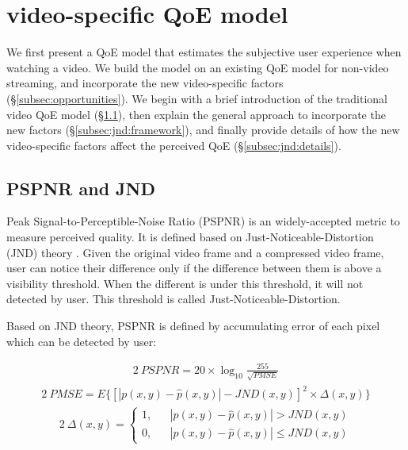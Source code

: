 
\section{\vr video-specific QoE model}
\label{sec:jnd}

We first present a QoE model that estimates the subjective user experience when watching a \vr video.
We build the model on an existing QoE model for non-\vr video streaming, and incorporate the new \vr video-specific factors (\S\ref{subsec:opportunities}).
We begin with a brief introduction of the traditional video QoE model (\S\ref{subsec:jnd:pspnr}), then explain the general approach to incorporate the new factors (\S\ref{subsec:jnd:framework}), and finally provide details of how the new \vr video-specific factors affect the perceived QoE (\S\ref{subsec:jnd:details}).

\subsection{PSPNR and JND}
\label{subsec:jnd:pspnr}

Peak Signal-to-Perceptible-Noise Ratio (PSPNR) \cite{PSPNR} is an widely-accepted metric to measure perceived quality. It is defined based on Just-Noticeable-Distortion (JND) theory \cite{JND}. Given the original video frame and a compressed video frame, user can notice their difference only if the difference between them is above a visibility threshold. When the different is under this threshold, it will not detected by user. This threshold is called Just-Noticeable-Distortion.

Based on JND theory, PSPNR is defined by accumulating error of each pixel which can be detected by user:

\begin{alignat}{2}\
\label{f1} PSPNR = 20 \times \log_{10}\frac{255}{\sqrt{PMSE}}
\end{alignat}
\begin{alignat}{2}\
PMSE=E\{ \left[ |p(x, y) - \hat{p}(x, y)| - JND(x, y)\right]^2 \times \Delta (x, y)\}
\end{alignat}
\begin{alignat}{2}\
\Delta (x, y) =\left\{
\begin{aligned}
1, & &|p(x, y) - \hat{p}(x, y)| > JND(x, y) \\
0, & &|p(x, y) - \hat{p}(x, y)| \le JND(x, y)
\end{aligned}
\right.
\end{alignat}

